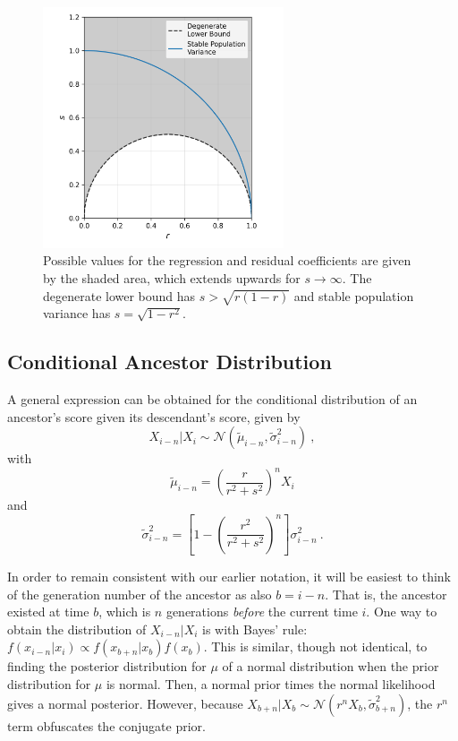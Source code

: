 \documentclass{svproc} %
\begin{document}
\begin{figure}[h]
\includegraphics[width=2.8in]{figures/possible_r_rs.png}
\centering
\caption{Possible values for the regression and residual coefficients are given by the shaded area, which extends upwards for $s \rightarrow \infty$. The degenerate lower bound has $s > \sqrt{r(1-r)}$ and stable population variance has $s = \sqrt{1-r^2}$.}
\label{fig:possible_r_rs}
\end{figure}


\subsection{Conditional Ancestor Distribution} \label{cad}

A general expression can be obtained for the conditional distribution of an ancestor's score given its descendant's score, given by
\begin{equation}
X_{i-n}|X_i \sim \mathcal{N}( \tilde{\mu}_{i-n}, \tilde{\sigma}_{i-n}^2) \ ,
\label{eq:a_dist}
\end{equation}
with
\begin{equation}
\tilde{\mu}_{i-n} = (\frac{r}{r^2+s^2})^n X_i
\label{eq:a_mean}
\end{equation}
and
\begin{equation}
\tilde{\sigma}_{i-n}^2 = [1 - (\frac{r^2}{r^2+s^2})^n] \sigma_{i-n}^2 \ .
\label{eq:a_var}
\end{equation}

In order to remain consistent with our earlier notation, it will be easiest to think of the generation number of the ancestor as also $b = i - n$. That is, the ancestor existed at time $b$, which is $n$ generations \emph{before} the current time $i$. One way to obtain the distribution of $X_{i-n}|X_i$ is with Bayes' rule: $f(x_{i-n}|x_i) \propto f(x_{b+n}|x_b) f(x_b)$. 
This is similar, though not identical, to finding the posterior distribution for $\mu$ of a normal distribution when the prior distribution for $\mu$ is normal. Then, a normal prior times the normal likelihood gives a normal posterior. However, because $X_{b+n}|X_b \sim \mathcal{N}(r^n X_b, \tilde{\sigma}_{b+n}^2)$, the $r^n$ term obfuscates the conjugate prior.
\end{document}
